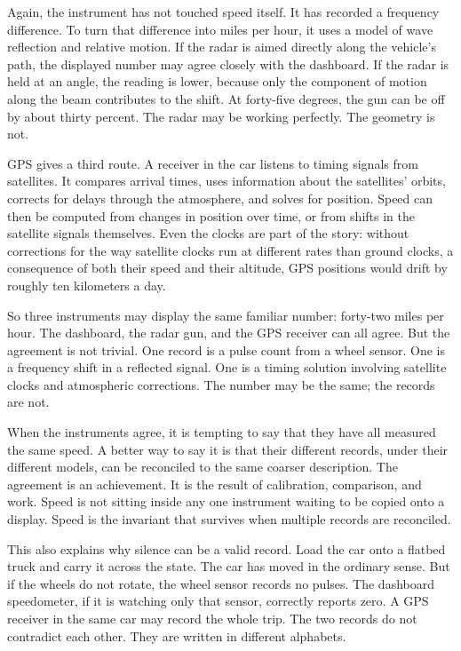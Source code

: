 Again, the instrument has not touched speed itself. It has recorded a frequency
difference. To turn that difference into miles per hour, it uses a model of
wave reflection and relative motion. If the radar is aimed directly along the
vehicle's path, the displayed number may agree closely with the dashboard. If
the radar is held at an angle, the reading is lower, because only the component
of motion along the beam contributes to the shift. At forty-five degrees, the
gun can be off by about thirty percent. The radar may be working perfectly. The
geometry is not.

GPS gives a third route. A receiver in the car listens to timing signals from
satellites. It compares arrival times, uses information about the satellites'
orbits, corrects for delays through the atmosphere, and solves for position.
Speed can then be computed from changes in position over time, or from shifts
in the satellite signals themselves. Even the clocks are part of the story:
without corrections for the way satellite clocks run at different rates than
ground clocks, a consequence of both their speed and their altitude, GPS
positions would drift by roughly ten kilometers a day.

So three instruments may display the same familiar number: forty-two miles per
hour. The dashboard, the radar gun, and the GPS receiver can all agree. But the
agreement is not trivial. One record is a pulse count from a wheel sensor. One
is a frequency shift in a reflected signal. One is a timing solution involving
satellite clocks and atmospheric corrections. The number may be the same; the
records are not.

When the instruments agree, it is tempting to say that they have all measured
the same speed. A better way to say it is that their different records, under
their different models, can be reconciled to the same coarser description. The
agreement is an achievement. It is the result of calibration, comparison, and
work. Speed is not sitting inside any one instrument waiting to be copied onto a
display. Speed is the invariant that survives when multiple records are
reconciled.

This also explains why silence can be a valid record. Load the car onto a
flatbed truck and carry it across the state. The car has moved in the ordinary
sense. But if the wheels do not rotate, the wheel sensor records no pulses. The
dashboard speedometer, if it is watching only that sensor, correctly reports
zero. A GPS receiver in the same car may record the whole trip. The two records
do not contradict each other. They are written in different alphabets.

